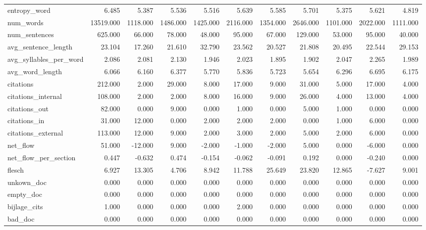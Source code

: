 \begin{tabular}{lrrrrrrrrrr}
\cline{1-11}
entropy\_word & 6.485 & 5.387 & 5.536 & 5.516 & 5.639 & 5.585 & 5.701 & 5.375 & 5.621 & 4.819 \\
\cline{1-11}
num\_words & 13519.000 & 1118.000 & 1486.000 & 1425.000 & 2116.000 & 1354.000 & 2646.000 & 1101.000 & 2022.000 & 1111.000 \\
\cline{1-11}
num\_sentences & 625.000 & 66.000 & 78.000 & 48.000 & 95.000 & 67.000 & 129.000 & 53.000 & 95.000 & 40.000 \\
\cline{1-11}
avg\_sentence\_length & 23.104 & 17.260 & 21.610 & 32.790 & 23.562 & 20.527 & 21.808 & 20.495 & 22.544 & 29.153 \\
\cline{1-11}
avg\_syllables\_per\_word & 2.086 & 2.081 & 2.130 & 1.946 & 2.023 & 1.895 & 1.902 & 2.047 & 2.265 & 1.989 \\
\cline{1-11}
avg\_word\_length & 6.066 & 6.160 & 6.377 & 5.770 & 5.836 & 5.723 & 5.654 & 6.296 & 6.695 & 6.175 \\
\cline{1-11}
citations & 212.000 & 2.000 & 29.000 & 8.000 & 17.000 & 9.000 & 31.000 & 5.000 & 17.000 & 4.000 \\
\cline{1-11}
citations\_internal & 108.000 & 2.000 & 2.000 & 8.000 & 16.000 & 9.000 & 26.000 & 4.000 & 13.000 & 4.000 \\
\cline{1-11}
citations\_out & 82.000 & 0.000 & 9.000 & 0.000 & 1.000 & 0.000 & 5.000 & 1.000 & 0.000 & 0.000 \\
\cline{1-11}
citations\_in & 31.000 & 12.000 & 0.000 & 2.000 & 2.000 & 2.000 & 0.000 & 1.000 & 6.000 & 0.000 \\
\cline{1-11}
citations\_external & 113.000 & 12.000 & 9.000 & 2.000 & 3.000 & 2.000 & 5.000 & 2.000 & 6.000 & 0.000 \\
\cline{1-11}
net\_flow & 51.000 & -12.000 & 9.000 & -2.000 & -1.000 & -2.000 & 5.000 & 0.000 & -6.000 & 0.000 \\
\cline{1-11}
net\_flow\_per\_section & 0.447 & -0.632 & 0.474 & -0.154 & -0.062 & -0.091 & 0.192 & 0.000 & -0.240 & 0.000 \\
\cline{1-11}
flesch & 6.927 & 13.305 & 4.706 & 8.942 & 11.788 & 25.649 & 23.820 & 12.865 & -7.627 & 9.001 \\
\cline{1-11}
unkown\_doc & 0.000 & 0.000 & 0.000 & 0.000 & 0.000 & 0.000 & 0.000 & 0.000 & 0.000 & 0.000 \\
\cline{1-11}
empty\_doc & 0.000 & 0.000 & 0.000 & 0.000 & 0.000 & 0.000 & 0.000 & 0.000 & 0.000 & 0.000 \\
\cline{1-11}
bijlage\_cits & 1.000 & 0.000 & 0.000 & 0.000 & 2.000 & 0.000 & 0.000 & 0.000 & 0.000 & 0.000 \\
\cline{1-11}
bad\_doc & 0.000 & 0.000 & 0.000 & 0.000 & 0.000 & 0.000 & 0.000 & 0.000 & 0.000 & 0.000 \\
\cline{1-11}
\bottomrule
\end{tabular}
